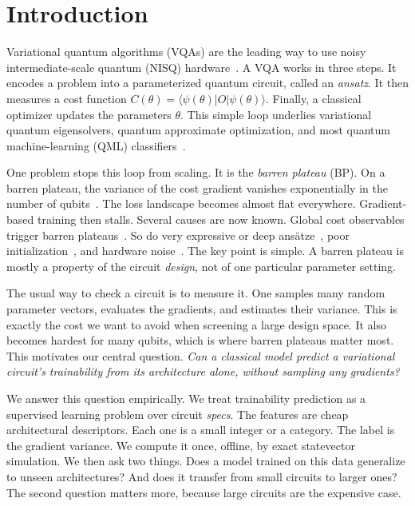 \documentclass[quantumrep,article,submit,pdftex,oneauthor]{Definitions/mdpi}
\begin{document}
\section{Introduction}

Variational quantum algorithms (VQAs) are the leading way to use noisy
intermediate-scale quantum (NISQ) hardware~\cite{cerezo2021vqa}. A VQA works in
three steps. It encodes a problem into a parameterized quantum circuit, called an
\emph{ansatz}. It then measures a cost function
$C(\theta)=\langle\psi(\theta)|O|\psi(\theta)\rangle$. Finally, a classical
optimizer updates the parameters $\theta$. This simple loop underlies variational
quantum eigensolvers, quantum approximate optimization, and most quantum
machine-learning (QML) classifiers~\cite{havlicek2019supervised,
farhi2018classification,schuld2020circuit}.

One problem stops this loop from scaling. It is the \emph{barren plateau} (BP).
On a barren plateau, the variance of the cost gradient vanishes exponentially in
the number of qubits~\cite{mcclean2018barren,larocca2025barren}. The loss
landscape becomes almost flat everywhere. Gradient-based training then stalls.
Several causes are now known. Global cost observables trigger barren
plateaus~\cite{cerezo2021cost}. So do very expressive or deep
ans\"atze~\cite{holmes2022expressibility}, poor
initialization~\cite{grant2019initialization}, and hardware
noise~\cite{wang2021noise}. The key point is simple. A barren plateau is mostly a
property of the circuit \emph{design}, not of one particular parameter setting.

The usual way to check a circuit is to measure it. One samples many random
parameter vectors, evaluates the gradients, and estimates their variance. This is
exactly the cost we want to avoid when screening a large design space. It also
becomes hardest for many qubits, which is where barren plateaus matter most. This
motivates our central question. \emph{Can a classical model predict a variational
circuit's trainability from its architecture alone, without sampling any
gradients?}

We answer this question empirically. We treat trainability prediction as a
supervised learning problem over circuit \emph{specs}. The features are cheap
architectural descriptors. Each one is a small integer or a category. The label
is the gradient variance. We compute it once, offline, by exact statevector
simulation. We then ask two things. Does a model trained on this data generalize
to unseen architectures? And does it transfer from small circuits to larger ones?
The second question matters more, because large circuits are the expensive case.
\end{document}
